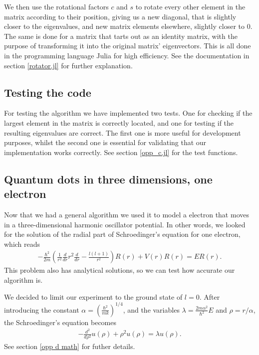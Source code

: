 \documentclass[a4paper]{article}
\begin{document}
We then use the rotational factors $c$ and $s$ to rotate every other element in the matrix according to their position, giving us a new diagonal, that is slightly closer to the eigenvalues, and new matrix elements elsewhere, slightly closer to 0. The same is done for a matrix that tarts out as an identity matrix, with the purpose of transforming it into the original matrix' eigenvectors. This is all done in the programming language Julia for high efficiency. See the documentation in section \ref{rotator.jl} for further explanation.

\subsection{Testing the code}

For testing the algorithm we have implemented two tests. One for checking if the largest element in the matrix is correctly located, and one for testing if the resulting eigenvalues are correct. The first one is more useful for development purposes, whilst the second one is essential for validating that our implementation works correctly. See section \ref{opp_c.jl} for the test functions.

\subsection{Quantum dots in three dimensions, one electron}

Now that we had a general algorithm we used it to model a electron that moves in a three-dimensional harmonic oscillator potential. In other words, we looked for the solution of the radial part of Schroedinger’s
equation for one electron, which reads
\begin{align}
- \frac{\hbar^2}{2m} \left( \frac{1}{r^2} \frac{d}{dr} r^2 \frac{d}{dr} - \frac{l(l+1)}{r^2}\right) R(r) + V(r) R(r) = ER(r).
\end{align}
This problem also has analytical solutions, so we can test how accurate our algorithm is.

We decided to limit our experiment to the ground state of $l=0$. After introducing the constant $\alpha = \left(\frac{\hbar^2}{mk}\right)^{1/4}$, and the variables $\lambda = \frac{2m\alpha^2}{\hbar^2}E$ and $\rho = r/\alpha$, the Schroedinger’s equation becomes
\begin{align}
-\frac{d^2}{d\rho^2} u(\rho) + \rho^2 u(\rho) = \lambda u(\rho). \label{simpel SE}
\end{align}
See section \ref{opp d math} for futher details. 
\end{document}
